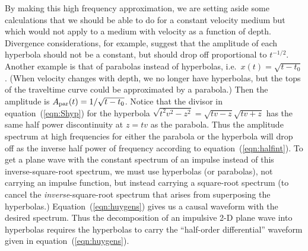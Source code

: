 {\par
By making this high frequency approximation,
we are setting aside some calculations
that we should be able to do for a constant velocity medium
but which would not apply to a medium with velocity as a function of depth.
Divergence considerations, for example,
suggest that the amplitude of each hyperbola should not be
a constant, but should drop off proportional to $t^{-1/2}$.
Another example is that of parabolas instead
of hyperbolas, i.e.~$x(t)=\sqrt{t-t_0}$.
(When velocity changes with depth, we no longer have hyperbolas,
but the tops of the traveltime curve could be approximated by a parabola.)
Then the amplitude is $A_{\rm par}(t)= 1/\sqrt{t-t_0}$.
Notice that the divisor in equation~(\ref{eqn:Shyp}) for the hyperbola
$\sqrt{t^2 v^2-z^2}=\sqrt{tv-z}\sqrt{tv+z}$
has the same half power discontinuity at $z=tv$ as the parabola.
Thus the amplitude spectrum at high frequencies for either
the parabola or the hyperbola will drop off as the inverse
half power of frequency according to equation~(\ref{eqn:halfint}).
To get a plane wave with the constant spectrum of an impulse
instead of this inverse-square-root spectrum,
we must use hyperbolas (or parabolas),
not carrying an impulse function,
but instead carrying a square-root spectrum
(to cancel the {\em  inverse}-square-root spectrum that arises
from superposing the hyperbolas.)
Equation~(\ref{eqn:huygens}) gives us a causal waveform with the desired spectrum.
Thus the decomposition of an impulsive 2-D plane
wave into hyperbolas requires the hyperbolas to carry
the ``half-order differential'' waveform given in equation~(\ref{eqn:huygens}).

}

